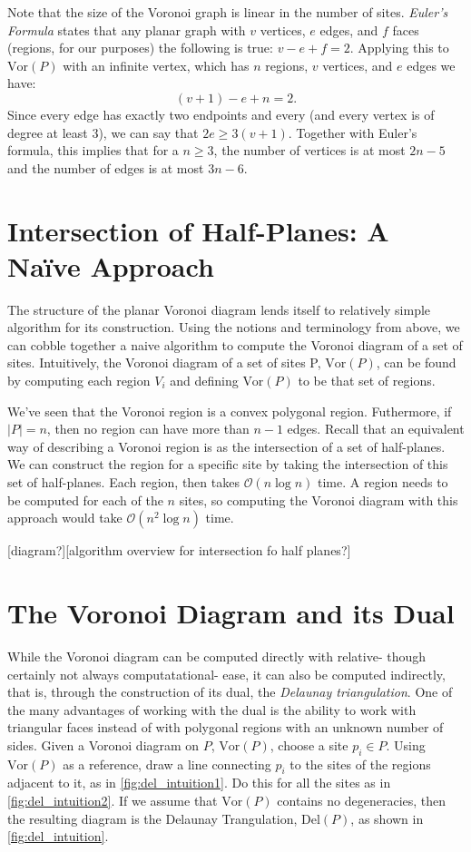 \documentclass[12pt,twoside]{reedthesis}
\begin{document}
  Note that the size of the Voronoi graph is linear in the number of sites. \emph{Euler's Formula} states that any planar graph with $v$ vertices, $e$ edges, and $f$ faces (regions, for our purposes) the following is true:
  $v - e + f = 2.$ Applying this to $\mbox{Vor}(P)$ with an infinite vertex, which has $n$ regions, $v$ vertices, and $e$ edges we have:
  $$(v + 1) - e + n = 2.$$ Since every edge has exactly two endpoints and every (and every vertex is of degree at least 3), we can say that $2e \geq 3(v + 1)$. Together with Euler's formula, this implies that for a $n\geq 3$, the number of vertices is at most $2n -5$ and the number of edges is at most $3n -6$. 
  \section{Intersection of Half-Planes: A Na{\"i}ve Approach} %
  \label{sec:a_naive_approach}
  The structure of the planar Voronoi diagram lends itself to relatively simple algorithm for its construction. Using the notions and terminology from above, we can cobble together a naive algorithm to compute the Voronoi diagram of a set of sites. Intuitively, the Voronoi diagram of a set of sites P, $\mbox{Vor}(P)$, can be found by computing each region $V_{i}$ and defining $\mbox{Vor}(P)$ to be that set of regions. \par

  We've seen that the Voronoi region is a convex polygonal region. Futhermore, if $|P| = n$, then no region can have more than $n-1$ edges. Recall that an equivalent way of describing a Voronoi region is as the intersection of a set of half-planes. We can construct the region for a specific site by taking the intersection of this set of half-planes. Each region, then takes $\mathcal{O}(n\log n)$ time. A region needs to be computed for each of the $n$ sites, so computing the Voronoi diagram with this approach would take $\mathcal{O}(n^{2}\log n)$ time.

  [diagram?][algorithm overview for intersection fo half planes?]
  
  \section{The Voronoi Diagram and its Dual} %
  \label{sec:the_voronoi_diagram_and_its_dual}
  While the Voronoi diagram can be computed directly with relative- though certainly not always computatational- ease, it can also be computed indirectly, that is, through the construction of its dual, the \emph{Delaunay triangulation}. One of the many advantages of working with the dual is the ability to work with triangular faces instead of with polygonal regions with an unknown number of sides. Given a Voronoi diagram on $P$, $\mbox{Vor}(P)$, choose a site $p_{i} \in P$. Using $\mbox{Vor}(P)$ as a reference, draw a line connecting $p_{i}$ to the sites of the regions adjacent to it, as in \cref{fig:del_intuition1}. Do this for all the sites as in \cref{fig:del_intuition2}. If we assume that $\mbox{Vor}(P)$ contains no degeneracies, then the resulting diagram is the Delaunay Trangulation, $\mbox{Del}(P)$, as shown in \cref{fig:del_intuition}.
\end{document}
